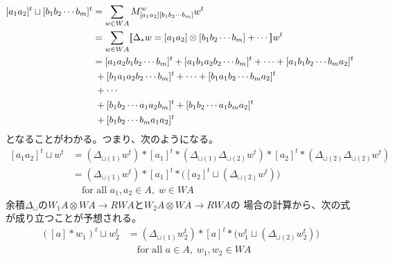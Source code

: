	\begin{equation*}\begin{split} %
		[a_1a_2]^t\sqcup [b_1b_2\cdots b_m]^t
		&= \sum_{w\in WA}M_{[a_1a_2][b_1b_2\cdots b_m]}^ww^t \\
		&= \sum_{w\in WA}\jump{\Delta_*w=[a_1a_2]\otimes [b_1b_2\cdots b_m]+\cdots}w^t \\
		&= [a_1a_2b_1b_2\cdots b_m]^t + [a_1b_1a_2b_2\cdots b_m]^t
			+ \cdots + [a_1b_1b_2\cdots b_ma_2]^t \\
		&\;+ [b_1a_1a_2b_2\cdots b_m]^t + \cdots + [b_1a_1b_2\cdots b_ma_2]^t \\
		&\;+ \cdots \\
		&\;+ [b_1b_2\cdots a_1a_2b_m]^t + [b_1b_2\cdots a_1b_ma_2]^t \\
		&\;+ [b_1b_2\cdots b_ma_1a_2]^t \\
	\end{split}\end{equation*} %
	となることがわかる。つまり、次のようになる。
	\begin{equation*}\begin{split} %
		[a_1a_2]^t\sqcup w^t
		&= (\Delta_{\sqcup(1)}w^t)*[a_1]^t
			*(\Delta_{\sqcup(1)}\Delta_{\sqcup(2)}w^t)*[a_2]^t
			*(\Delta_{\sqcup(2)}\Delta_{\sqcup(2)}w^t) \\
		&= (\Delta_{\sqcup(1)}w^t)*[a_1]^t
			*\bigl([a_2]^t\sqcup(\Delta_{\sqcup(2)}w^t)\bigr) \\
		&\quad\text{for all }a_1,a_2\in A,\;w\in WA
	\end{split}\end{equation*} %
	余積$\Delta_\sqcup$の$W_1A\otimes WA\to RWA$と$W_2A\otimes WA\to RWA$の
	場合の計算から、次の式が成り立つことが予想される。
	\begin{equation*}\begin{split} %
		([a]*w_1)^t\sqcup w_2^t 
		&= (\Delta_{\sqcup(1)}w_2^t)*[a]^t
			*\bigl(w_1^t\sqcup(\Delta_{\sqcup(2)}w_2^t)\bigr) \\
		&\quad\text{for all }a\in A,\;w_1,w_2\in WA
	\end{split}\end{equation*} %

